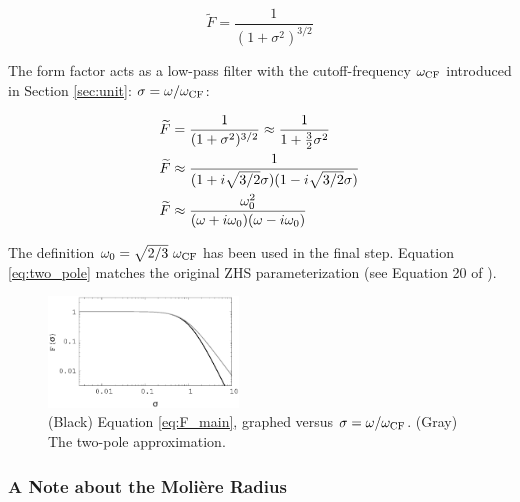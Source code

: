 \documentclass[amsmath,amssymb,aps,prd,10pt,twocolumn]{revtex4}
\begin{document}
\begin{equation}
\boxed{
\widetilde{F} = \frac{1}{(1+\sigma^2)^{3/2}}
} \label{eq:F_main}
\end{equation}

The form factor acts as a low-pass filter with the cutoff-frequency $\omega_{\rm CF}$ introduced in Section \ref{sec:unit}: $\sigma = \omega/\omega_{\rm CF}$:

\begin{align}
\widetilde{F} &= \frac{1}{(1+\sigma^2)^{3/2}} \approx \frac{1}{1+\frac{3}{2} \sigma^2} \\
\widetilde{F} &\approx \frac{1}{(1+i \sqrt{3/2}\sigma)(1-i \sqrt{3/2} \sigma)} \\
\widetilde{F} &\approx \frac{\omega_{\rm 0}^2}{(\omega+i\omega_{\rm 0})(\omega-i\omega_{\rm 0})} \label{eq:two_pole}
\end{align}

The definition $\omega_{\rm 0} = \sqrt{2/3} ~ \omega_{\rm CF}$ has been used in the final step.  Equation \ref{eq:two_pole} matches the original ZHS parameterization (see Equation 20 of \cite{zhs}).

\begin{figure}
\centering
\includegraphics[width=0.45\textwidth]{April23_plot1.eps}
\caption{\label{fig:F}  (Black) Equation \ref{eq:F_main}, graphed versus $\sigma = \omega/\omega_{\rm CF}$. (Gray) The two-pole approximation.}
\end{figure}

\subsubsection{A Note about the Moli\`{e}re Radius}
\end{document}
